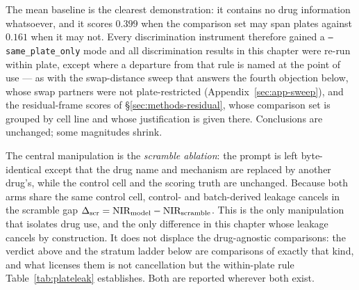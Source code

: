 The mean baseline is the clearest demonstration: it contains no drug information whatsoever, and it
scores $0.399$ when the comparison set may span plates against $0.161$ when it may not. Every
discrimination instrument therefore gained a \texttt{--same\_plate\_only} mode and all discrimination
results in this chapter were re-run within plate, except where a departure from that rule is named
at the point of use --- as with the swap-distance sweep that answers the fourth objection below,
whose swap partners were not plate-restricted (Appendix~\ref{sec:app-sweep}), and the residual-frame
scores of \S\ref{sec:methods-residual}, whose comparison set is grouped by cell line and whose
justification is given there. Conclusions are unchanged; some magnitudes shrink.

The central manipulation is the \emph{scramble ablation}: the prompt is left byte-identical except
that the drug name and mechanism are replaced by another drug's, while the control cell and the
scoring truth are unchanged. Because both arms share the same control cell, control- and
batch-derived leakage cancels in the scramble gap $\Delta_{\textrm{scr}} = \textrm{NIR}_{\textrm{model}} -
\textrm{NIR}_{\textrm{scramble}}$. This is the only manipulation that isolates drug use, and the only difference in this chapter whose
leakage cancels by construction. It does not displace the drug-agnostic comparisons: the verdict
above and the stratum ladder below are comparisons of exactly that kind, and what licenses them is
not cancellation but the within-plate rule Table~\ref{tab:plateleak} establishes. Both are reported
wherever both exist.

